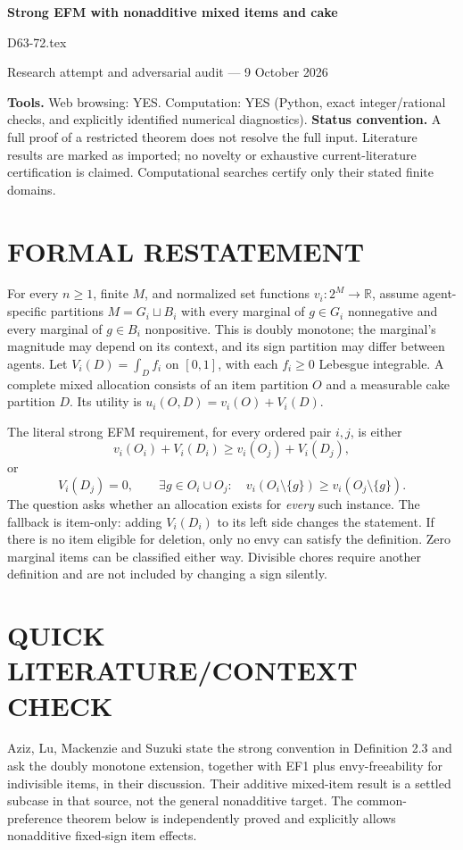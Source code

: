 \documentclass[11pt,a4paper]{article}
\theoremstyle{remark}\newtheorem{remark}[theorem]{Remark}
\newcommand{\R}{\mathbb R}
\begin{document}
\begin{center}
{\LARGE\bfseries Strong EFM with nonadditive mixed items and cake}\par\medskip
{\large D63-72.tex}\par
Research attempt and adversarial audit --- 9 October 2026
\end{center}
\label{problem:OP-0594}
\label{audited:ECON-008}
\label{audited:conventions}
\textbf{Tools.} Web browsing: YES. Computation: YES (Python, exact integer/rational checks, and explicitly identified numerical diagnostics).
\textbf{Status convention.} A full proof of a restricted theorem does not resolve the full input. Literature results are marked as imported; no novelty or exhaustive current-literature certification is claimed. Computational searches certify only their stated finite domains.

\section{FORMAL RESTATEMENT}
For every $n\ge1$, finite $M$, and normalized set functions $v_i:2^M\to\R$, assume agent-specific partitions $M=G_i\sqcup B_i$ with every marginal of $g\in G_i$ nonnegative and every marginal of $g\in B_i$ nonpositive. This is doubly monotone; the marginal's magnitude may depend on its context, and its sign partition may differ between agents. Let $V_i(D)=\int_Df_i$ on $[0,1]$, with each $f_i\ge0$ Lebesgue integrable. A complete mixed allocation consists of an item partition $O$ and a measurable cake partition $D$. Its utility is $u_i(O,D)=v_i(O)+V_i(D)$.

The literal strong EFM requirement, for every ordered pair $i,j$, is either
\[
v_i(O_i)+V_i(D_i)\ge v_i(O_j)+V_i(D_j),
\]
or
\[
V_i(D_j)=0,\qquad
\exists g\in O_i\cup O_j:\quad v_i(O_i\setminus\{g\})\ge v_i(O_j\setminus\{g\}).
\]
The question asks whether an allocation exists for \emph{every} such instance. The fallback is item-only: adding $V_i(D_i)$ to its left side changes the statement. If there is no item eligible for deletion, only no envy can satisfy the definition. Zero marginal items can be classified either way. Divisible chores require another definition and are not included by changing a sign silently.

\section{QUICK LITERATURE/CONTEXT CHECK}
Aziz, Lu, Mackenzie and Suzuki \cite{cake} state the strong convention in Definition 2.3 and ask the doubly monotone extension, together with EF1 plus envy-freeability for indivisible items, in their discussion. Their additive mixed-item result is a settled subcase in that source, not the general nonadditive target. The common-preference theorem below is independently proved and explicitly allows nonadditive fixed-sign item effects.
\end{document}
